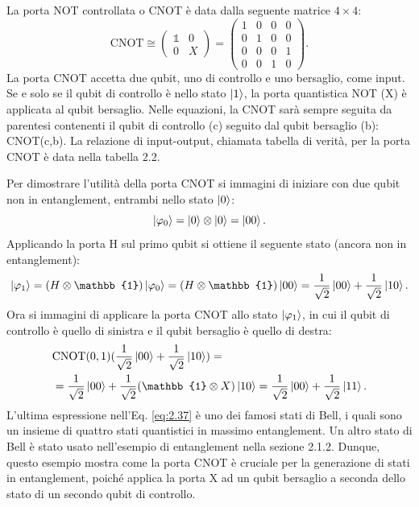 La porta NOT controllata o CNOT è data dalla seguente matrice $4\times4$: 
\begin{equation} \label{eq:2.34}
    \text{CNOT} \cong 
    \begin{pmatrix}
        \mathbb{1} & 0 \\ 0 & X
    \end{pmatrix}
    =
    \begin{pmatrix}
        1&0&0&0\\
        0&1&0&0\\
        0&0&0&1\\
        0&0&1&0
    \end{pmatrix}
    .
\end{equation}
La porta CNOT accetta due qubit, uno di controllo e uno bersaglio, come input. 
Se e solo se il qubit di controllo è nello stato $\ket{1}$, la porta quantistica 
NOT (X) è applicata al qubit bersaglio. Nelle equazioni, la CNOT sarà sempre 
seguita da parentesi contenenti il qubit di controllo (c) seguito dal qubit 
bersaglio (b): %
CNOT(c,b). La relazione di input-output, chiamata tabella di verità, per la porta 
CNOT è data nella tabella 2.2. 

Per dimostrare l'utilità della porta CNOT si immagini di iniziare con due 
qubit non in entanglement, entrambi nello stato $\ket{0}$: 
\begin{equation} \label{eq:2.35}
    \ket{\varphi_0} = \ket{0} \otimes \ket{0} = \ket{00}.
\end{equation}
Applicando la porta H sul primo qubit si ottiene il seguente stato (ancora non 
in entanglement): 
\begin{equation} \label{eq:2.36}
    \ket{\varphi_1} = (H \otimes \mathbb{1}) \ket{\varphi_0} = 
    (H \otimes \mathbb{1}) \ket{00} = \frac{1}{\sqrt{2}} \ket{00} + 
    \frac{1}{\sqrt{2}} \ket{10}.
\end{equation}
Ora si immagini di applicare la porta CNOT allo stato $\ket{\varphi_1}$, in cui 
il qubit di controllo è quello di sinistra e il qubit bersaglio è quello di 
destra: 
\begin{equation} \label{eq:2.37}
    \begin{split}
    &\text{CNOT}(0,1)(\frac{1}{\sqrt{2}} \ket{00} + \frac{1}{\sqrt{2}} \ket{10}) = \\
    & = \frac{1}{\sqrt{2}} \ket{00} + \frac{1}{\sqrt{2}} (\mathbb{1} \otimes 
    X) \ket{10} = \frac{1}{\sqrt{2}} \ket{00} + \frac{1}{\sqrt{2}} \ket{11}.
    \end{split}
\end{equation}
L'ultima espressione nell'Eq. \ref{eq:2.37} è uno dei famosi stati di Bell, 
i quali sono un insieme di quattro stati quantistici in massimo entanglement. 
Un altro stato di Bell è stato usato nell'esempio di entanglement nella sezione 
2.1.2. Dunque, questo esempio mostra come la porta CNOT è cruciale per la 
generazione di stati in entanglement, poiché applica la porta X ad un qubit 
bersaglio a seconda dello stato di un secondo qubit di controllo. 

